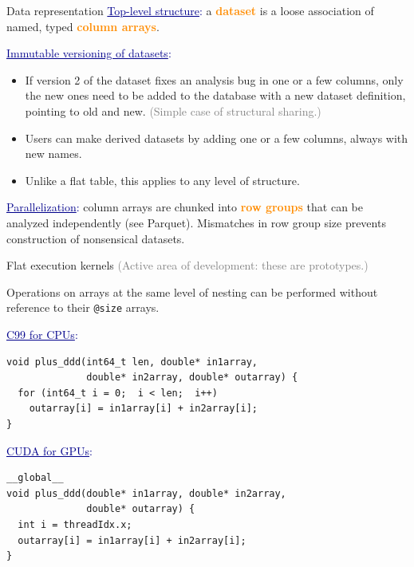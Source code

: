 \documentclass{beamer}
\begin{document}
\begin{frame}[fragile]{Data representation}
\vspace{0.35 cm}
\textcolor{darkblue}{\underline{Top-level structure}:} a \textcolor{darkorange}{\bf dataset} is a loose association of named, typed \textcolor{darkorange}{\bf column arrays}.

\vspace{0.3 cm}
\textcolor{darkblue}{\underline{Immutable versioning of datasets}:}
\begin{itemize}\setlength{\itemsep}{0.2 cm}
\item If version 2 of the dataset fixes an analysis bug in one or a few columns, only the new ones need to be added to the database with a new dataset definition, pointing to old and new. \textcolor{gray}{(Simple case of structural sharing.)}
\item Users can make derived datasets by adding one or a few columns, always with new names.
\item Unlike a flat table, this applies to any level of structure.
\end{itemize}

\vspace{0.3 cm}
\textcolor{darkblue}{\underline{Parallelization}:} column arrays are chunked into \textcolor{darkorange}{\bf row groups} that can be analyzed independently (see Parquet). Mismatches in row group size prevents construction of nonsensical datasets.
\end{frame}

\begin{frame}[fragile]{Flat execution kernels}
\vspace{0.5 cm}
\textcolor{gray}{(Active area of development: these are prototypes.)}
\small

\vspace{0.25 cm}
Operations on arrays at the same level of nesting can be performed without reference to their {\tt @size} arrays.

\vspace{0.25 cm}
\textcolor{darkblue}{\normalsize \underline{C99 for CPUs}:}
\vspace{-0.1 cm}
\begin{verbatim}
void plus_ddd(int64_t len, double* in1array,
              double* in2array, double* outarray) {
  for (int64_t i = 0;  i < len;  i++)
    outarray[i] = in1array[i] + in2array[i];
}
\end{verbatim}

\vspace{0.25 cm}
\textcolor{darkblue}{\normalsize \underline{CUDA for GPUs}:}
\vspace{-0.1 cm}
\begin{verbatim}
__global__
void plus_ddd(double* in1array, double* in2array,
              double* outarray) {
  int i = threadIdx.x;
  outarray[i] = in1array[i] + in2array[i];
}
\end{verbatim}
\end{frame}
\end{document}
